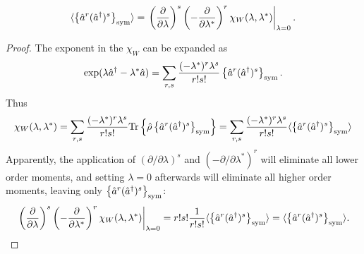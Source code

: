 \begin{lemma}
\label{lmm:multimode-formalism:moments-from-chi}
\[
	\langle \left\{  \hat{a}^r (\hat{a}^\dagger)^s  \right\}_{\mathrm{sym}} \rangle
	= \left.
		\left( \frac{\partial}{\partial \lambda} \right)^s
		\left( -\frac{\partial}{\partial \lambda^*} \right)^r
		\chi_W (\lambda, \lambda^*)
	\right|_{\lambda=0}.
\]
\end{lemma}
\begin{proof}
The exponent in the $\chi_W$ can be expanded as
\[
	\exp (\lambda \hat{a}^\dagger - \lambda^* \hat{a})
	= \sum\limits_{r,s}
		\frac{(-\lambda^*)^r \lambda^s}{r!s!}
		\left\{  \hat{a}^r (\hat{a}^\dagger)^s  \right\}_{\mathrm{sym}}.
\]
Thus
\[
	\chi_W(\lambda, \lambda^*)
	= \sum\limits_{r,s}
		\frac{(-\lambda^*)^r \lambda^s}{r!s!}
		\mathrm{Tr} \left\{ 
			\hat{\rho} \left\{  \hat{a}^r (\hat{a}^\dagger)^s  \right\}_{\mathrm{sym}}
		 \right\}
	= \sum\limits_{r,s}
		\frac{(-\lambda^*)^r \lambda^s}{r!s!}
		\langle \left\{  \hat{a}^r (\hat{a}^\dagger)^s  \right\}_{\mathrm{sym}} \rangle
\]
Apparently, the application of $(\partial / \partial \lambda)^s$ and $(-\partial / \partial \lambda^*)^r$ will eliminate all lower order moments,
and setting $\lambda = 0$ afterwards will eliminate all higher order moments,
leaving only $\left\{  \hat{a}^r (\hat{a}^\dagger)^s  \right\}_{\mathrm{sym}}$:
\[
	\left.
		\left( \frac{\partial}{\partial \lambda} \right)^s
		\left( -\frac{\partial}{\partial \lambda^*} \right)^r
		\chi_W (\lambda, \lambda^*)
	\right|_{\lambda=0}
	= r! s! \frac{1}{r! s!}
		\langle \left\{  \hat{a}^r (\hat{a}^\dagger)^s  \right\}_{\mathrm{sym}} \rangle
	= \langle \left\{  \hat{a}^r (\hat{a}^\dagger)^s  \right\}_{\mathrm{sym}} \rangle.
	\qedhere
\]
\end{proof}

